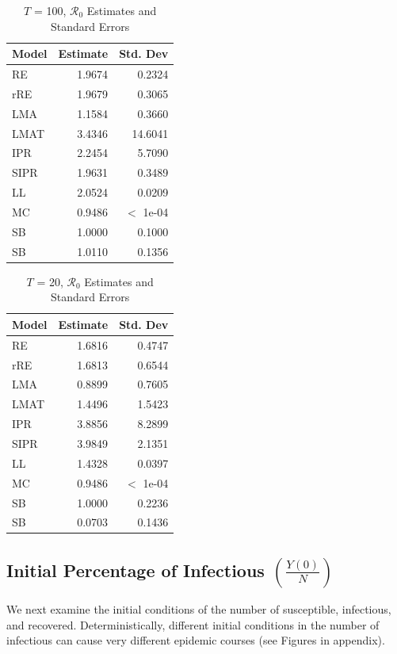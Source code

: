 \documentclass[12pt]{article}
\newcommand{\rr}{\ensuremath{\mathcal{R}_0}}
\begin{document}
\begin{table}[H]
	
	
	\centering
	\begin{tabular}[t]{l|r|r}
		\hline
		Model & Estimate & Std. Dev\\
		\hline
		RE & 1.9674 & 0.2324\\
		\hline
		rRE & 1.9679 & 0.3065\\
		\hline
		LMA & 1.1584 & 0.3660\\
		\hline
		LMAT & 3.4346 & 14.6041\\
		\hline
		IPR & 2.2454 & 5.7090\\
		\hline
		SIPR & 1.9631 & 0.3489\\
		\hline
		LL & 2.0524 & 0.0209\\
		\hline
		MC & 0.9486 & $<$ 1e-04\\
		\hline
		SB & 1.0000 & 0.1000\\
		\hline
		SB & 1.0110 & 0.1356\\
		\hline
	\end{tabular}
	\caption{ $T$ = 100, $\rr$ Estimates and Standard Errors}
\end{table}

\begin{table}[H]
	\centering
	\begin{tabular}[t]{l|r|r}
		\hline
		Model & Estimate & Std. Dev\\
		\hline
		RE & 1.6816 & 0.4747\\
		\hline
		rRE & 1.6813 & 0.6544\\
		\hline
		LMA & 0.8899 & 0.7605\\
		\hline
		LMAT & 1.4496 & 1.5423\\
		\hline
		IPR & 3.8856 & 8.2899\\
		\hline
		SIPR & 3.9849 & 2.1351\\
		\hline
		LL & 1.4328 & 0.0397\\
		\hline
		MC & 0.9486 & $<$ 1e-04\\
		\hline
		SB & 1.0000 & 0.2236\\
		\hline
		SB & 0.0703 & 0.1436\\
		\hline
	\end{tabular}
	\caption{$T$ = 20, $\rr$ Estimates and Standard Errors}
\end{table}


\subsection{Initial Percentage of Infectious $\left (\frac{Y(0)}{N}\right)$}\label{sec:res-inf}
We next examine the initial conditions of the number of susceptible, infectious, and recovered.  Deterministically, different initial conditions in the number of infectious can cause very different epidemic courses (see Figures in appendix).
\end{document}
